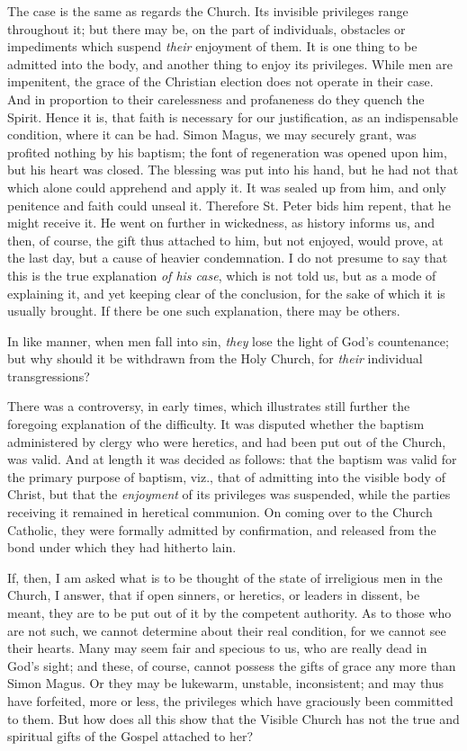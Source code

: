 The case is the same as regards the Church. Its invisible
privileges range throughout it; but there may be, on the part of
individuals, obstacles or impediments which suspend \emph{their}
enjoyment of them. It is one thing to be admitted into the body, and
another thing to enjoy its privileges. While men are impenitent, the
grace of the Christian election does not operate in their case. And in
proportion to their carelessness and profaneness do they quench the
Spirit. Hence it is, that faith is necessary for our justification, as
an indispensable condition, where it can be had. Simon Magus, we may
securely grant, was profited nothing by his baptism; the font of
regeneration was opened upon him, but his heart was closed. The
blessing was put into his hand, but he had not that which alone could
apprehend and apply it. It was sealed up from him, and only penitence
and faith could unseal it. Therefore St. Peter bids him repent, that
he might receive it. He went on further in wickedness, as history
informs us, and then, of course, the gift thus attached to him, but
not enjoyed, would prove, at the last day, but a cause of heavier
condemnation. I do not presume to say that this is the true
explanation \emph{of his case}, which is not told us, but as a mode of
explaining it, and yet keeping clear of the conclusion, for the sake
of which it is usually brought. If there be one such explanation,
there may be others.

In like manner, when men fall into sin, \emph{they} lose the light
of God's countenance; but why should it be withdrawn from the Holy
Church, for \emph{their} individual transgressions?

There was a controversy, in early times, which illustrates still
further the foregoing explanation of the difficulty. It was disputed
whether the baptism administered by clergy who were heretics, and had
been put out of the Church, was valid. And at length it was decided as
follows: that the baptism was valid for the primary purpose of
baptism, viz., that of admitting into the visible body of Christ, but
that the \emph{enjoyment} of its privileges was suspended, while the
parties receiving it remained in heretical communion. On coming over
to the Church Catholic, they were formally admitted by confirmation,
and released from the bond under which they had hitherto lain.

If, then, I am asked what is to be thought of the state of
irreligious men in the Church, I answer, that if open sinners, or
heretics, or leaders in dissent, be meant, they are to be put out of
it by the competent authority. As to those who are not such, we cannot
determine about their real condition, for we cannot see their hearts.
Many may seem fair and specious to us, who are really dead in God's
sight; and these, of course, cannot possess the gifts of grace any
more than Simon Magus. Or they may be lukewarm, unstable,
inconsistent; and may thus have forfeited, more or less, the
privileges which have graciously been committed to them. But how does
all this show that the Visible Church has not the true and spiritual
gifts of the Gospel attached to her?

